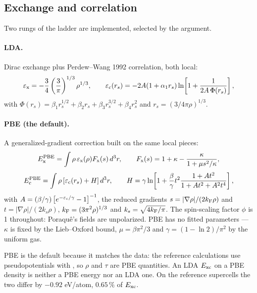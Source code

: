 \subsection{Exchange and correlation}
\label{sec:xc-tech}

Two rungs of the ladder are implemented, selected by the 
argument.

\paragraph{LDA.} Dirac exchange plus Perdew--Wang 1992 correlation, both local:
\begin{equation}
  \varepsilon_{\rm x} = -\frac34\left(\frac{3}{\pi}\right)^{1/3}\rho^{1/3},
  \qquad
  \varepsilon_{\rm c}(r_s) = -2A(1+\alpha_1 r_s)
    \ln\!\left[1 + \frac{1}{2A\,\Phi(r_s)}\right],
\end{equation}
with $\Phi(r_s) = \beta_1 r_s^{1/2} + \beta_2 r_s + \beta_3 r_s^{3/2}
+ \beta_4 r_s^{2}$ and $r_s = (3/4\pi\rho)^{1/3}$.

\paragraph{PBE (the default).} A generalized-gradient correction built on the
same local pieces:
\begin{equation}
  E_{\rm x}^{\rm PBE} = \int\rho\,\varepsilon_{\rm x}(\rho)F_{\rm x}(s)\,d^3r,
  \qquad
  F_{\rm x}(s) = 1 + \kappa - \frac{\kappa}{1 + \mu s^2/\kappa},
\end{equation}
\begin{equation}
  E_{\rm c}^{\rm PBE} = \int\rho\left[\varepsilon_{\rm c}(r_s) + H\right]d^3r,
  \qquad
  H = \gamma\ln\!\left[1 + \frac{\beta}{\gamma}t^2
      \frac{1 + At^2}{1 + At^2 + A^2t^4}\right],
\end{equation}
with $A = (\beta/\gamma)\left[e^{-\varepsilon_{\rm c}/\gamma} - 1\right]^{-1}$,
the reduced gradients $s = |\nabla\rho|/(2k_{\rm F}\rho)$ and
$t = |\nabla\rho|/(2k_s\rho)$, $k_{\rm F} = (3\pi^2\rho)^{1/3}$ and
$k_s = \sqrt{4k_{\rm F}/\pi}$. The spin-scaling factor $\phi$ is 1 throughout:
Poraqu\^e's fields are unpolarized. PBE has no fitted parameters --- $\kappa$
is fixed by the Lieb--Oxford bound, $\mu = \beta\pi^2/3$ and $\gamma =
(1-\ln2)/\pi^2$ by the uniform gas.

\begin{ptip}
PBE is the default because it matches the data: the reference calculations use
 pseudopotentials with , so $\rho$ and $\tau$ are
PBE quantities. An LDA $E_{\rm xc}$ on a PBE density is neither a PBE energy
nor an LDA one. On the reference supercells the two differ by $-0.92$ eV/atom,
$0.65\,\%$ of $E_{\rm xc}$.
\end{ptip}

